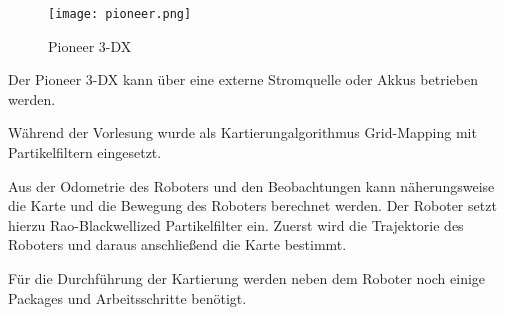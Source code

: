 \begin{figure}[!htb]
	\centering
	\texttt{[image: pioneer.png]}
	\caption{Pioneer 3-DX}
	\label{fig:pioneer}
\end{figure}

Der Pioneer 3-DX kann über eine externe Stromquelle oder Akkus betrieben werden.\par
Während der Vorlesung wurde als Kartierungalgorithmus Grid-Mapping mit Partikelfiltern eingesetzt.\par
Aus der Odometrie des Roboters und den Beobachtungen kann näherungsweise die Karte und die Bewegung des Roboters berechnet werden. Der Roboter setzt hierzu Rao-Blackwellized Partikelfilter ein. Zuerst wird die Trajektorie des Roboters und daraus anschließend die Karte bestimmt.\par
Für die Durchführung der Kartierung werden neben dem Roboter noch einige Packages und Arbeitsschritte benötigt.


